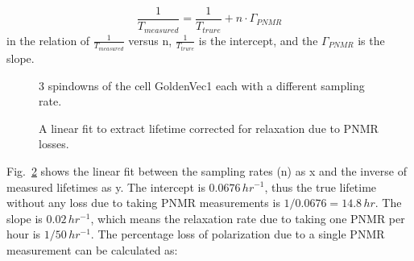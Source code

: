 \begin{equation}
\frac{1}{T_{measured}} = \frac{1}{T_{trure}} + n\cdot \Gamma_{PNMR}
\end{equation}
in the relation of $\frac{1}{T_{measured}}$ versus n, $\frac{1}{T_{trure}}$ is the intercept, and the $\Gamma_{PNMR}$ is the slope.

\begin{figure}[t!]
	\centering
	\caption{{3 spindowns of the cell GoldenVec1 each with a different sampling rate.}}
	\label{3spindowns}
\end{figure}

\begin{figure}[t!]
	\centering
	\caption{{A linear fit to extract lifetime corrected for relaxation due to PNMR losses.}}
	\label{corrected_T1}
\end{figure}

Fig.~\ref{corrected_T1} shows the linear fit between the sampling rates (n) as x and the inverse of measured lifetimes as y. The intercept is $0.0676\,hr^{-1}$, thus the true lifetime without any loss due to taking PNMR measurements is $1/0.0676=14.8\,hr$. The slope is $0.02\,hr^{-1}$, which means the relaxation rate due to taking one PNMR per hour is $1/50\,hr^{-1}$. The percentage loss of polarization due to a single PNMR measurement can be calculated as:

